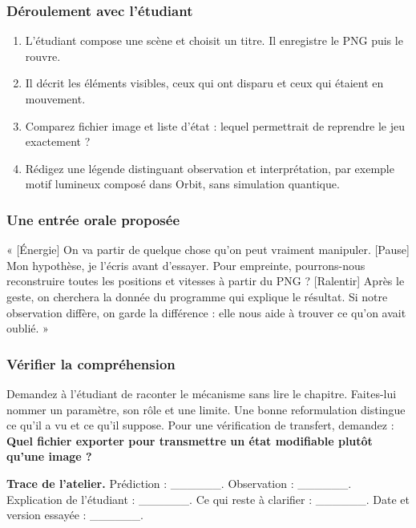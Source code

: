 \documentclass[
  canadien,
  11pt,
  letterpaper,
]{article}
\providecommand{\tightlist}{%
  \setlength{\itemsep}{0pt}\setlength{\parskip}{0pt}}
\begin{document}
\subsubsection{Déroulement avec
l'étudiant}\label{duxe9roulement-avec-luxe9tudiant-14}

\begin{enumerate}
\def\labelenumi{\arabic{enumi}.}
\tightlist
\item
  L'étudiant compose une scène et choisit un titre. Il enregistre le PNG
  puis le rouvre.
\item
  Il décrit les éléments visibles, ceux qui ont disparu et ceux qui
  étaient en mouvement.
\item
  Comparez fichier image et liste d'état : lequel permettrait de
  reprendre le jeu exactement ?
\item
  Rédigez une légende distinguant observation et interprétation, par
  exemple motif lumineux composé dans Orbit, sans simulation quantique.
\end{enumerate}

\subsubsection{Une entrée orale
proposée}\label{une-entruxe9e-orale-proposuxe9e-14}

« {[}Énergie{]} On va partir de quelque chose qu'on peut vraiment
manipuler. {[}Pause{]} Mon hypothèse, je l'écris avant d'essayer. Pour
empreinte, pourrons-nous reconstruire toutes les positions et vitesses à
partir du PNG ? {[}Ralentir{]} Après le geste, on cherchera la donnée du
programme qui explique le résultat. Si notre observation diffère, on
garde la différence : elle nous aide à trouver ce qu'on avait oublié. »

\subsubsection{Vérifier la
compréhension}\label{vuxe9rifier-la-compruxe9hension-14}

Demandez à l'étudiant de raconter le mécanisme sans lire le chapitre.
Faites-lui nommer un paramètre, son rôle et une limite. Une bonne
reformulation distingue ce qu'il a vu et ce qu'il suppose. Pour une
vérification de transfert, demandez : \textbf{Quel fichier exporter pour
transmettre un état modifiable plutôt qu'une image ?}

\textbf{Trace de l'atelier.} Prédiction : \_\_\_\_\_\_. Observation :
\_\_\_\_\_\_. Explication de l'étudiant : \_\_\_\_\_\_. Ce qui reste à
clarifier : \_\_\_\_\_\_. Date et version essayée : \_\_\_\_\_\_.
\end{document}
